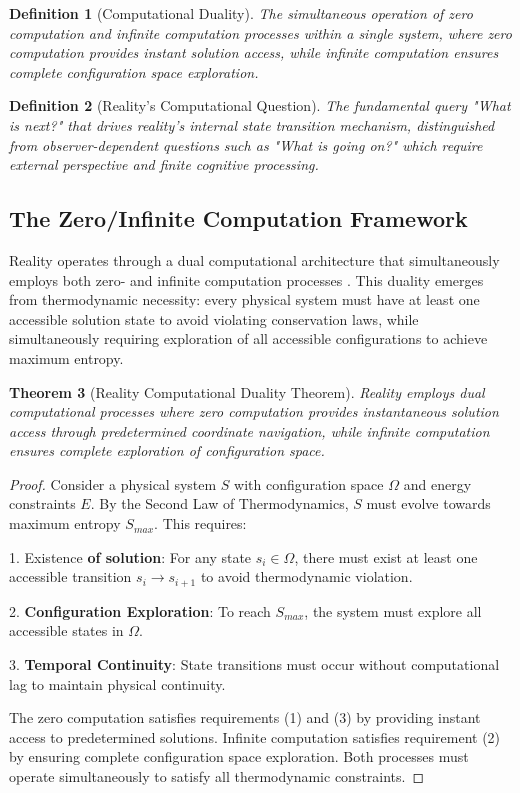 \documentclass[12pt,a4paper]{article}
\newtheorem{theorem}{Theorem}[section]
\newtheorem{definition}[theorem]{Definition}
\begin{document}
\begin{definition}[Computational Duality]
The simultaneous operation of zero computation and infinite computation processes within a single system, where zero computation provides instant solution access, while infinite computation ensures complete configuration space exploration.
\end{definition}

\begin{definition}[Reality's Computational Question]
The fundamental query "What is next?" that drives reality's internal state transition mechanism, distinguished from observer-dependent questions such as "What is going on?" which require external perspective and finite cognitive processing.
\end{definition}

\subsection{The Zero/Infinite Computation Framework}

Reality operates through a dual computational architecture that simultaneously employs both zero- and infinite computation processes \citep{Boltzmann1877}. This duality emerges from thermodynamic necessity: every physical system must have at least one accessible solution state to avoid violating conservation laws, while simultaneously requiring exploration of all accessible configurations to achieve maximum entropy.

\begin{theorem}[Reality Computational Duality Theorem]
Reality employs dual computational processes where zero computation provides instantaneous solution access through predetermined coordinate navigation, while infinite computation ensures complete exploration of configuration space.
\end{theorem}

\begin{proof}
Consider a physical system $S$ with configuration space $\Omega$ and energy constraints $E$. By the Second Law of Thermodynamics, $S$ must evolve towards maximum entropy $S_{max}$. This requires:

1. Existence \textbf{of solution}: For any state $s_i \in \Omega$, there must exist at least one accessible transition $s_i \rightarrow s_{i+1}$ to avoid thermodynamic violation.

2. \textbf{Configuration Exploration}: To reach $S_{max}$, the system must explore all accessible states in $\Omega$.

3. \textbf{Temporal Continuity}: State transitions must occur without computational lag to maintain physical continuity.

The zero  computation satisfies requirements (1) and (3) by providing instant access to predetermined solutions. Infinite computation satisfies requirement (2) by ensuring complete configuration space exploration. Both processes must operate simultaneously to satisfy all thermodynamic constraints.
\end{proof}
\end{document}
